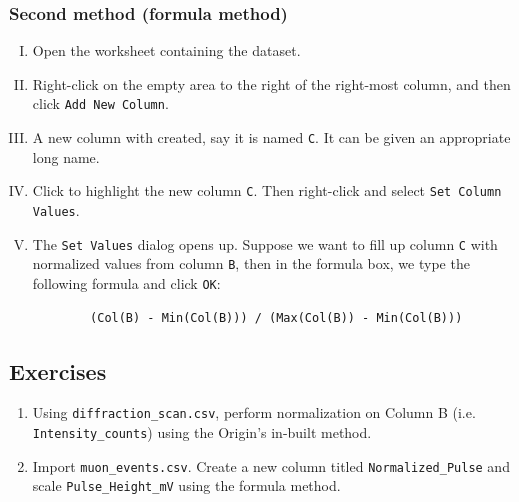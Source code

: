 		\subsubsection{Second method (formula method)}
			\begin{enumerate}[I.]
				\item Open the worksheet containing the dataset.
				
				\item Right-click on the empty area to the right of the right-most column, and then click \verb|Add New Column|.
				
				\item A new column with created, say it is named \verb|C|. It can be given an appropriate long name.
				
				\item Click to highlight the new column \verb|C|. Then right-click and select \verb|Set Column Values|.
				
				\item The \verb|Set Values| dialog opens up. Suppose we want to fill up column \verb|C| with normalized values from column \verb|B|, then in the formula box, we type the following formula and click \verb|OK|:
				\begin{verbatim}
		(Col(B) - Min(Col(B))) / (Max(Col(B)) - Min(Col(B)))
				\end{verbatim}
			\end{enumerate}
			
	\subsection*{Exercises}
		\begin{enumerate}
			\item Using \verb|diffraction_scan.csv|, perform normalization on Column B (i.e. \verb|Intensity_counts|) using the Origin's in-built method.
			
			\item Import \verb|muon_events.csv|. Create a new column titled \verb|Normalized_Pulse| and scale \verb|Pulse_Height_mV| using the formula method.
		\end{enumerate}